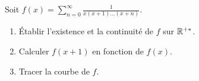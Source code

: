 \documentclass[a4paper,11pt,reqno]{amsart}
\begin{document}
\begin{exo}

  Soit $\displaystyle f(x) = \sum_{n=0}^\infty \frac1{x(x+1)\dots(x+n)}$.
  \begin{enumerate}
    \item \'Etablir l'existence et la continuité de $f$ sur $\mathbb{R}^{+*}$.
    \item Calculer $f(x+1)$ en fonction de $f(x)$.
    \item Tracer la courbe de $f$.
\end{enumerate}
\end{exo}
\end{document}
